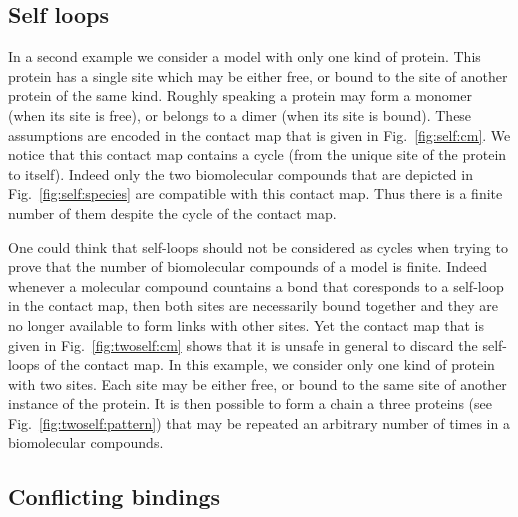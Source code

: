 \documentclass{entcs}
\begin{document}
\subsection{Self loops}

In a second example we consider a model with only one kind of protein. This protein has a single site which may be either free, or bound to the site of another protein of the same kind. Roughly speaking a protein may form a monomer (when its site is free), or belongs to a dimer (when its site is bound). These assumptions are encoded in the contact map that is given in Fig.~\ref{fig:self:cm}. We notice that this contact map contains a cycle (from the unique site of the protein to itself). Indeed only the two biomolecular compounds that are depicted in Fig.~\ref{fig:self:species} are compatible with this contact map. Thus there is a finite number of them despite the cycle of the contact map.

One could think that self-loops should not be considered as cycles when trying to prove that the number of biomolecular compounds of a model is finite. Indeed whenever a molecular compound countains a bond that coresponds to a self-loop in the contact map, then both sites are necessarily  bound together and they are no longer available to form links with other sites. Yet the contact map that is given in Fig.~\ref{fig:twoself:cm} shows that it is unsafe in general  to discard the self-loops of the contact map. In this example, we consider only one kind of protein with two sites. Each site may be either free, or bound to the same site of another instance of the protein. It is then possible to form a chain a three proteins (see Fig.~\ref{fig:twoself:pattern}) that may be repeated an arbitrary number of times in a biomolecular compounds.

\subsection{Conflicting bindings}
\end{document}
